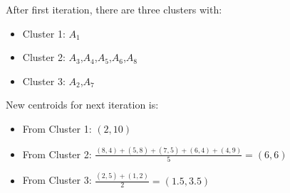 \documentclass{article}
\begin{document}
After first iteration, there are three clusters with:
\begin{itemize}
    \item Cluster 1: $A_1$
    \item Cluster 2: $A_3$,$A_4$,$A_5$,$A_6$,$A_8$
    \item Cluster 3: $A_2$,$A_7$
\end{itemize}

New centroids for next iteration is:
\begin{itemize}
    \item From Cluster 1: $(2,10)$
    \item From Cluster 2: $\frac{(8,4)+(5,8)+(7,5)+(6,4)+(4,9)}{5}=(6,6)$
    \item From Cluster 3: $\frac{(2,5)+(1,2)}{2}=(1.5,3.5)$
\end{itemize}
\end{document}
